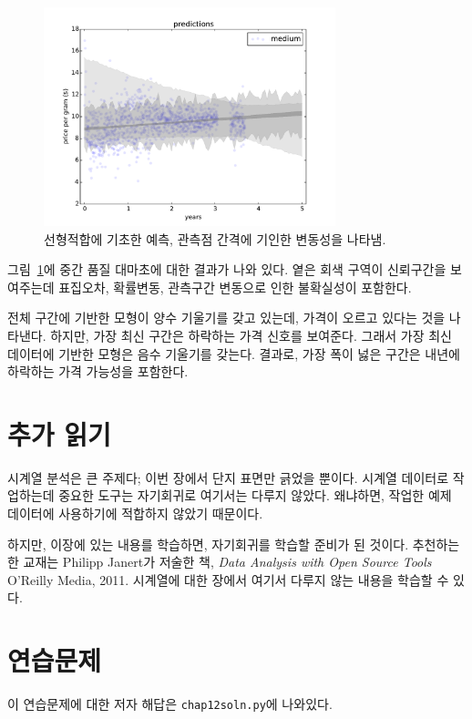 \begin{figure}
\centerline{\includegraphics[height=2.5in]{figs/timeseries5.pdf}}
\caption{선형적합에 기초한 예측, 관측점 간격에 기인한 변동성을 나타냄.}
\label{timeseries5}
\end{figure}

그림~\ref{timeseries5}에 중간 품질 대마초에 대한 결과가 나와 있다.
옅은 회색 구역이 신뢰구간을 보여주는데 표집오차, 확률변동, 관측구간 변동으로 인한 불확실성이 포함한다.

전체 구간에 기반한 모형이 양수 기울기를 갖고 있는데, 가격이 오르고 있다는 것을 나타낸다. 하지만, 가장 최신 구간은 하락하는 가격 신호를 보여준다. 
그래서 가장 최신 데이터에 기반한 모형은 음수 기울기를 갖는다.
결과로, 가장 폭이 넗은 구간은 내년에 하락하는 가격 가능성을 포함한다.


\section{추가 읽기}
시계열 분석은 큰 주제다; 이번 장에서 단지 표면만 긁었을 뿐이다.
시계열 데이터로 작업하는데 중요한 도구는 자기회귀로 여기서는 다루지 않았다. 왜냐하면, 작업한 예제 데이터에 사용하기에 적합하지 않았기 때문이다.

하지만, 이장에 있는 내용를 학습하면, 자기회귀를 학습할 준비가 된 것이다. 추천하는 한 교재는 Philipp Janert가 저술한 책, {\it Data Analysis with Open Source Tools} O'Reilly Media, 2011. 
시계열에 대한 장에서 여기서 다루지 않는 내용을 학습할 수 있다.


\section{연습문제}

이 연습문제에 대한 저자 해답은 \verb"chap12soln.py"에 나와있다.

